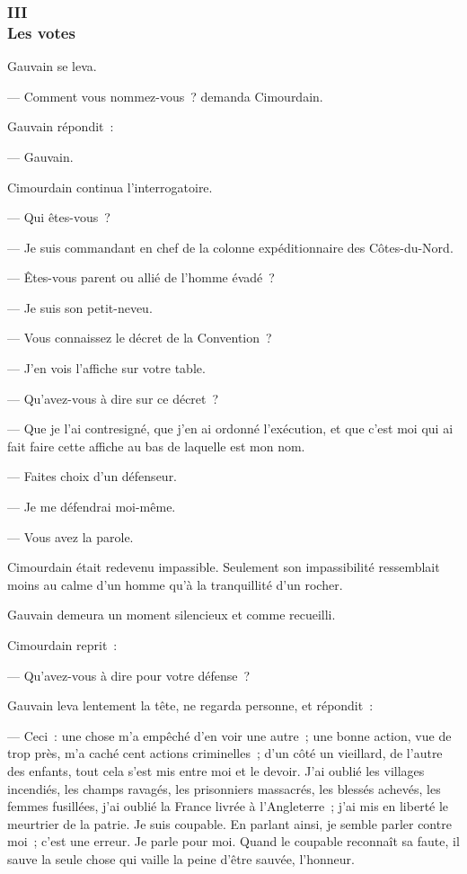 \documentclass[french,twoside]{book} %
\begin{document}
 \subsubsection[{III. Les votes}]{III \\
Les votes}
\label{p3l7c3}
\noindent Gauvain se leva.\par
— Comment vous nommez-vous ? demanda Cimourdain.\par
Gauvain répondit :\par
— Gauvain.\par
Cimourdain continua l’interrogatoire.\par
— Qui êtes-vous ?\par
— Je suis commandant en chef de la colonne expéditionnaire des Côtes-du-Nord.\par
— Êtes-vous parent ou allié de l’homme évadé ?\par
— Je suis son petit-neveu.\par
— Vous connaissez le décret de la Convention ?\par
— J’en vois l’affiche sur votre table.\par
— Qu’avez-vous à dire sur ce décret ?\par
— Que je l’ai contresigné, que j’en ai ordonné l’exécution, et que c’est moi qui ai fait faire cette affiche au bas de laquelle est mon nom.\par
— Faites choix d’un défenseur.\par
— Je me défendrai moi-même.\par
— Vous avez la parole.\par
 Cimourdain était redevenu impassible. Seulement son impassibilité ressemblait moins au calme d’un homme qu’à la tranquillité d’un rocher.\par
Gauvain demeura un moment silencieux et comme recueilli.\par
Cimourdain reprit :\par
— Qu’avez-vous à dire pour votre défense ?\par
Gauvain leva lentement la tête, ne regarda personne, et répondit :\par
— Ceci : une chose m’a empêché d’en voir une autre ; une bonne action, vue de trop près, m’a caché cent actions criminelles ; d’un côté un vieillard, de l’autre des enfants, tout cela s’est mis entre moi et le devoir. J’ai oublié les villages incendiés, les champs ravagés, les prisonniers massacrés, les blessés achevés, les femmes fusillées, j’ai oublié la France livrée à l’Angleterre ; j’ai mis en liberté le meurtrier de la patrie. Je suis coupable. En parlant ainsi, je semble parler contre moi ; c’est une erreur. Je parle pour moi. Quand le coupable reconnaît sa faute, il sauve la seule chose qui vaille la peine d’être sauvée, l’honneur.\par
\end{document}
